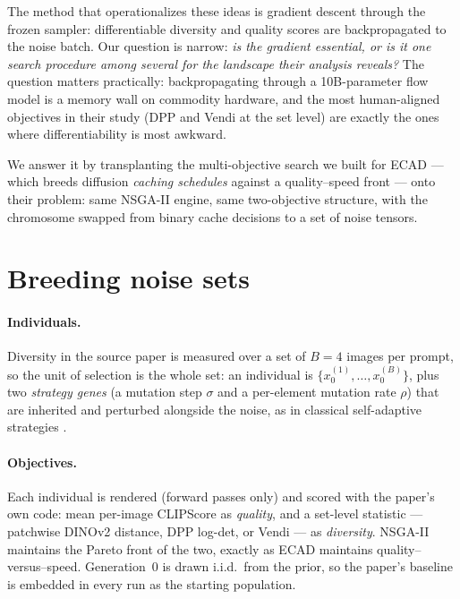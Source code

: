 \documentclass[10pt,twocolumn,letterpaper]{article}
\begin{document}
The method that operationalizes these ideas is gradient descent through the
frozen sampler: differentiable diversity and quality scores are backpropagated
to the noise batch. Our question is narrow: \emph{is the gradient essential, or
is it one search procedure among several for the landscape their analysis
reveals?} The question matters practically: backpropagating through a
10B-parameter flow model is a memory wall on commodity hardware, and the most
human-aligned objectives in their study (DPP and Vendi at the set level) are
exactly the ones where differentiability is most awkward.

We answer it by transplanting the multi-objective search we built for ECAD
\cite{aggarwal2026ecad} --- which breeds diffusion \emph{caching schedules}
against a quality--speed front --- onto their problem: same NSGA-II
\cite{deb2002nsga2} engine, same two-objective structure, with the chromosome
swapped from binary cache decisions to a set of noise tensors.

\section{Breeding noise sets}

\paragraph{Individuals.} Diversity in the source paper is measured over a set
of $B{=}4$ images per prompt, so the unit of selection is the whole set: an
individual is $\{x_0^{(1)},\dots,x_0^{(B)}\}$, plus two \emph{strategy genes}
(a mutation step $\sigma$ and a per-element mutation rate $\rho$) that are
inherited and perturbed alongside the noise, as in classical self-adaptive
strategies \cite{beyer2002es}.

\paragraph{Objectives.} Each individual is rendered (forward passes only) and
scored with the paper's own code: mean per-image CLIPScore as \emph{quality},
and a set-level statistic --- patchwise DINOv2 distance, DPP log-det, or Vendi
--- as \emph{diversity}. NSGA-II maintains the Pareto front of the two, exactly
as ECAD maintains quality--versus--speed. Generation~0 is drawn i.i.d.\ from
the prior, so the paper's baseline is embedded in every run as the starting
population.
\end{document}
